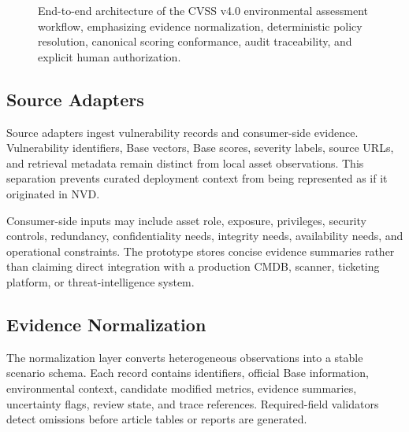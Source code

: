 \documentclass[conference]{IEEEtran}
\begin{document}
\begin{figure}[t]
\caption{End-to-end architecture of the CVSS v4.0 environmental assessment workflow, emphasizing evidence normalization, deterministic policy resolution, canonical scoring conformance, audit traceability, and explicit human authorization.}
\label{fig:architecture}
\end{figure}

\subsection{Source Adapters}

Source adapters ingest vulnerability records and consumer-side evidence.
Vulnerability identifiers, Base vectors, Base scores, severity labels, source
URLs, and retrieval metadata remain distinct from local asset observations.
This separation prevents curated deployment context from being represented as
if it originated in NVD.

Consumer-side inputs may include asset role, exposure, privileges, security
controls, redundancy, confidentiality needs, integrity needs, availability
needs, and operational constraints. The prototype stores concise evidence
summaries rather than claiming direct integration with a production CMDB,
scanner, ticketing platform, or threat-intelligence system.

\subsection{Evidence Normalization}

The normalization layer converts heterogeneous observations into a stable
scenario schema. Each record contains identifiers, official Base information,
environmental context, candidate modified metrics, evidence summaries,
uncertainty flags, review state, and trace references. Required-field
validators detect omissions before article tables or reports are generated.
\end{document}
